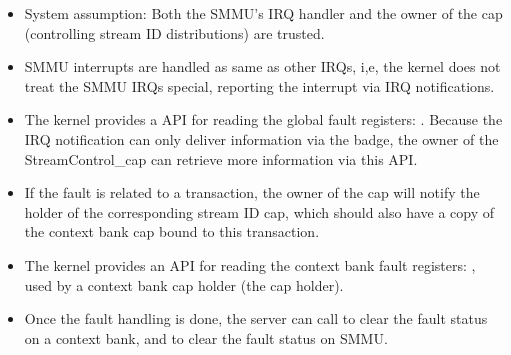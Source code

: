 \begin{itemize}
\item System assumption: Both the SMMU's IRQ handler and the owner of the
     cap (controlling stream ID distributions) are trusted.
\item SMMU interrupts are handled as same as other IRQs, i,e, the kernel does not
    treat the SMMU IRQs special, reporting the interrupt via IRQ notifications.
\item The kernel provides a API for reading the global fault registers:
    . Because
    the IRQ notification can only deliver information via the badge, the owner
    of the StreamControl\_cap can retrieve more information via this API.
\item If the fault is related to a transaction, the owner of the
     cap will notify the holder of the corresponding
    stream ID cap, which should also have a copy of the context bank cap bound to
    this transaction.
\item The kernel provides an API for reading the context bank fault registers:
    , used by a context bank
    cap holder (the  cap holder).
\item Once the fault handling is done, the server can call
     to clear the fault
    status on a context bank, and
    to clear the fault status on SMMU.
\end{itemize}

